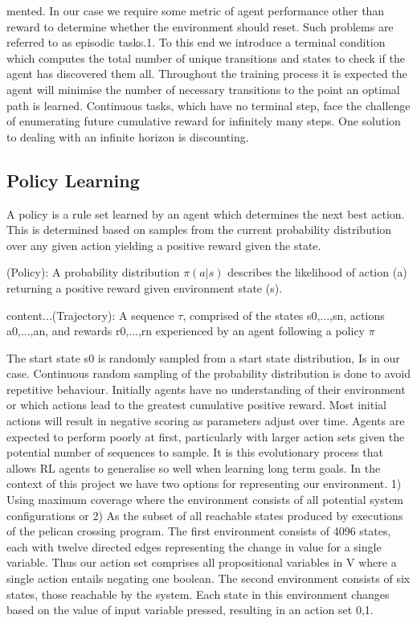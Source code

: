 \documentclass[runningheads]{llncs}
\begin{document}
mented. In our case we require some metric of agent performance other than reward
to determine whether the environment should reset. Such problems are referred to as
episodic tasks.1. To this end we introduce a terminal condition which computes the total
number of unique transitions and states to check if the agent has discovered them all.
Throughout the training process it is expected the agent will minimise the number of
necessary transitions to the point an optimal path is learned. Continuous tasks, which
have no terminal step, face the challenge of enumerating future cumulative reward for
infinitely many steps. One solution to dealing with an infinite horizon is discounting.

\subsection{Policy Learning}
A policy is a rule set learned by an agent which determines the next best action. This is determined based on samples from the current probability distribution over any given action yielding a positive reward given the state.

\begin{theorem}(Policy): A probability distribution $\pi(a|s)$ describes the likelihood of action (a) returning a positive reward given environment state (s).
\end{theorem}

\begin{theorem}
	content...(Trajectory): A sequence $\tau$, comprised of the states s0,...,sn, actions
	a0,...,an, and rewards r0,...,rn experienced by an agent following a policy $\pi$
\end{theorem}
The start state s0 is randomly sampled from a start state distribution, Is in our
case. Continuous random sampling of the probability distribution is done to avoid
repetitive behaviour. Initially agents have no understanding of their environment or
which actions lead to the greatest cumulative positive reward. Most initial actions will
result in negative scoring as parameters adjust over time. Agents are expected to perform
poorly at first, particularly with larger action sets given the potential number of sequences
to sample. It is this evolutionary process that allows RL agents to generalise so well
when learning long term goals.
In the context of this project we have two options for representing our environment.
1) Using maximum coverage where the environment consists of all potential system
configurations or 2) As the subset of all reachable states produced by executions of the
pelican crossing program. The first environment consists of 4096 states, each with twelve
directed edges representing the change in value for a single variable. Thus our action
set comprises all propositional variables in V where a single action entails negating
one boolean. The second environment consists of six states, those reachable by the
system. Each state in this environment changes based on the value of input variable
pressed, resulting in an action set {0,1}.
\end{document}

